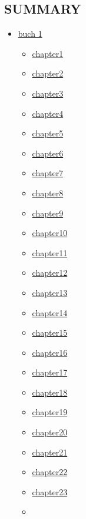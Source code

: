 \documentclass[
]{article}
\author{}
\date{\vspace{-2.5em}}
\providecommand{\tightlist}{%
  \setlength{\itemsep}{0pt}\setlength{\parskip}{0pt}}
\begin{document}
\subsection{SUMMARY}\label{summary}

\begin{itemize}
\tightlist
\item
  \href{book1-0.md}{buch 1}

  \begin{itemize}
  \tightlist
  \item
    \href{benjamin13.2-1-3.md}{chapter1}
  \item
    \href{benjamin13.2-1-9.md}{chapter2}
  \item
    \href{benjamin13.2-1-13.md}{chapter3}
  \item
    \href{benjamin13.2-1-15.md}{chapter4}
  \item
    \href{benjamin13.2-1-16.md}{chapter5}
  \item
    \href{benjamin13.2-1-18.md}{chapter6}
  \item
    \href{benjamin13.2-1-19.md}{chapter7}
  \item
    \href{benjamin13.2-1-20.md}{chapter8}
  \item
    \href{benjamin13.2-1-25.md}{chapter9}
  \item
    \href{benjamin13.2-1-27.md}{chapter10}
  \item
    \href{benjamin13.2-1-29.md}{chapter11}
  \item
    \href{benjamin13.2-1-30.md}{chapter12}
  \item
    \href{benjamin13.2-1-34.md}{chapter13}
  \item
    \href{benjamin13.2-1-35.md}{chapter14}
  \item
    \href{benjamin13.2-1-38.md}{chapter15}
  \item
    \href{benjamin13.2-1-40.md}{chapter16}
  \item
    \href{benjamin13.2-1-41.md}{chapter17}
  \item
    \href{benjamin13.2-1-43.md}{chapter18}
  \item
    \href{benjamin13.2-1-46.md}{chapter19}
  \item
    \href{benjamin13.2-1-49.md}{chapter20}
  \item
    \href{benjamin13.2-1-50.md}{chapter21}
  \item
    \href{benjamin13.2-1-52.md}{chapter22}
  \item
    \href{benjamin13.2-1-53.md}{chapter23}
  \item

\end{itemize}
\end{itemize}
\end{document}
